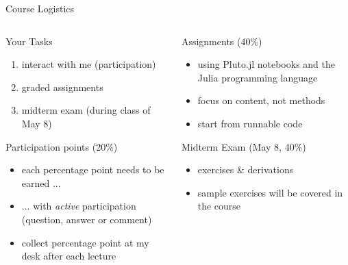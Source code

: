 \documentclass[aspectratio=169,mathserif]{beamer}
\begin{document}
\begin{frame}{Course Logistics}
  \begin{columns}[T]
  \begin{column}{0.5\linewidth}
   
    \begin{block}{Your Tasks}
      \begin{enumerate}
      \item interact with me (participation)
      \item graded assignments
      \item midterm exam (during class of May 8)
      \end{enumerate}
    \end{block} 
    \begin{block}{Participation points (20\%)}
      \begin{itemize}
      \item each percentage point needs to be earned ...
      \item ... with \emph{active} participation (question, answer or comment)
      \item collect percentage point at my desk after each lecture
      \end{itemize}
    \end{block}
  \end{column}
  \begin{column}{0.5\linewidth}
    \begin{block}{Assignments (40\%)}
      \begin{itemize}
      \item using Pluto.jl notebooks and the Julia programming language
      \item focus on content, not methods
      \item start from runnable code
      \end{itemize}
    \end{block}
     \begin{block}{Midterm Exam (May 8, 40\%)}
      \begin{itemize}
      \item exercises \& derivations
      \item sample exercises will be covered in the course
      \end{itemize} 
     \end{block}
  \end{column}
\end{columns}
  
\end{frame}
\end{document}
